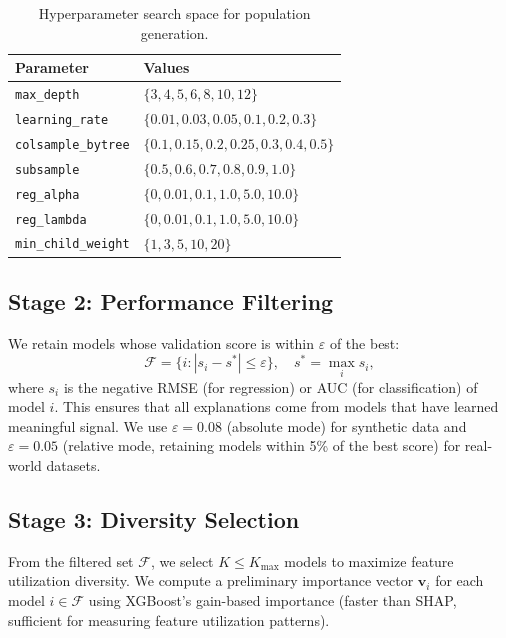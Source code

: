 \documentclass[11pt]{article}
\begin{document}
\begin{table}[htbp]
\centering
\caption{Hyperparameter search space for population generation.}
\label{tab:search_space}
\begin{tabular}{ll}
\toprule
\textbf{Parameter} & \textbf{Values} \\
\midrule
\texttt{max\_depth}         & $\{3, 4, 5, 6, 8, 10, 12\}$ \\
\texttt{learning\_rate}     & $\{0.01, 0.03, 0.05, 0.1, 0.2, 0.3\}$ \\
\texttt{colsample\_bytree}  & $\{0.1, 0.15, 0.2, 0.25, 0.3, 0.4, 0.5\}$ \\
\texttt{subsample}          & $\{0.5, 0.6, 0.7, 0.8, 0.9, 1.0\}$ \\
\texttt{reg\_alpha}         & $\{0, 0.01, 0.1, 1.0, 5.0, 10.0\}$ \\
\texttt{reg\_lambda}        & $\{0, 0.01, 0.1, 1.0, 5.0, 10.0\}$ \\
\texttt{min\_child\_weight} & $\{1, 3, 5, 10, 20\}$ \\
\bottomrule
\end{tabular}
\end{table}

\subsection{Stage 2: Performance Filtering}

We retain models whose validation score is within $\varepsilon$ of the
best:
\begin{equation}
  \mathcal{F} = \{i : |s_i - s^*| \leq \varepsilon\},
  \quad s^* = \max_i s_i,
  \label{eq:filter}
\end{equation}
where $s_i$ is the negative RMSE (for regression) or AUC (for
classification) of model $i$. This ensures that all explanations come from
models that have learned meaningful signal. We use $\varepsilon = 0.08$
(absolute mode) for synthetic data and $\varepsilon = 0.05$ (relative
mode, retaining models within 5\% of the best score) for real-world
datasets.

\subsection{Stage 3: Diversity Selection}

From the filtered set $\mathcal{F}$, we select $K \leq K_{\max}$
models to maximize feature utilization diversity. We compute a
preliminary importance vector $\mathbf{v}_i$ for each model $i \in
\mathcal{F}$ using XGBoost's gain-based importance (faster than SHAP,
sufficient for measuring feature utilization patterns).
\end{document}
